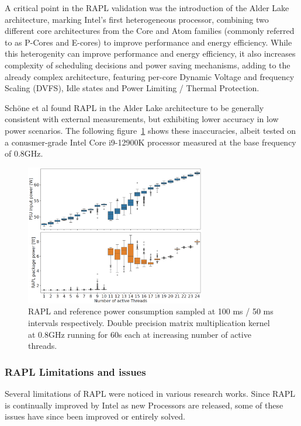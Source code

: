 A critical point in the RAPL validation was the introduction of the Alder Lake architecture, marking Intel's first heterogeneous processor, combining two different core architectures from the Core and Atom families (commonly referred to as P-Cores and E-cores) to improve performance and energy efficiency. While this heterogenity can improve performance and energy efficiency, it also increases complexity of scheduling decisions and power saving mechanisms, adding to the already complex architecture, featuring per-core Dynamic Voltage and frequency Scaling (DVFS), Idle states and Power Limiting / Thermal Protection.

Schöne et al\parencite{schone2024energy} found RAPL in the Alder Lake architecture to be generally consistent with external measurements, but exhibiting lower accuracy in low power scenarios. The following figure~\ref{fig:rapl_vs_PSU_validation} shows these inaccuracies, albeit tested on a conusmer-grade Intel Core i9-12900K processor measured at the base frequency of 0.8GHz.
\begin{figure}[ht]
    \centering
    \includegraphics[width=0.7\textwidth]{Figures/rapl_vs_PSU_validation.png}
    \caption[RAPL validation: CPU vs. PSU]{RAPL and reference power consumption sampled at 100 ms / 50 ms intervals respectively. Double precision matrix multiplication kernel at 0.8GHz running for 60s each at increasing number of active threads\parencite{schone2024energy}.}
    \label{fig:rapl_vs_PSU_validation}
\end{figure}

\subsubsection{RAPL Limitations and issues}
\label{sec:rapllimitations}
Several limitations of RAPL were noticed in various research works. Since RAPL is continually improved by Intel as new Processors are released, some of these issues have since been improved or entirely solved. 

